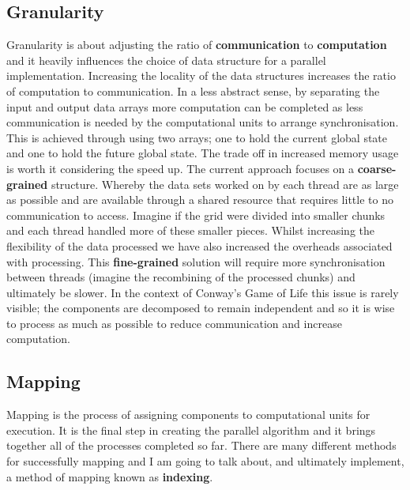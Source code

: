 \documentclass[11pt]{article} %
\begin{document}
\subsection*{Granularity}
Granularity is about adjusting the ratio of {\bf communication} to {\bf computation} and it heavily influences the choice of data structure for a parallel implementation. Increasing the locality of the data structures increases the ratio of computation to communication. In a less abstract sense, by separating the input and output data arrays more computation can be completed as less communication is needed by the computational units to arrange synchronisation. This is achieved through using two arrays; one to hold the current global state and one to hold the future global state. The trade off in increased memory usage is worth it considering the speed up.\cite[p87]{ref9} The current approach focuses on a {\bf coarse-grained} structure. Whereby the data sets worked on by each thread are as large as possible and are available through a shared resource that requires little to no communication to access. Imagine if the grid were divided into smaller chunks and each thread handled more of these smaller pieces. Whilst increasing the flexibility of the data processed we have also increased the overheads associated with processing. This {\bf fine-grained} solution will require more synchronisation between threads (imagine the recombining of the processed chunks) and ultimately be slower. In the context of Conway's Game of Life this issue is rarely visible; the components are decomposed to remain independent and so it is wise to process as much as possible to reduce communication and increase computation.
\subsection*{Mapping}
Mapping is the process of assigning components to computational units for execution. It is the final step in creating the parallel algorithm and it brings together all of the processes completed so far. There are many different methods for successfully mapping and I am going to talk about, and ultimately implement, a method of mapping known as {\bf indexing}.\cite[p89]{ref9}
\end{document}
